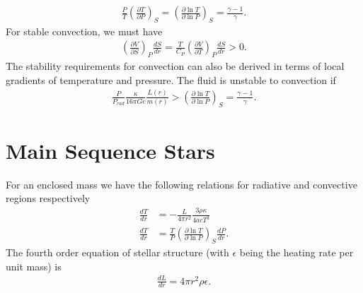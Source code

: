 \begin{multicols}{2}
\begin{align}
\frac{P}{T}\left(\frac{\partial T}{\partial P}\right)_S = \left(\frac{\partial \ln T}{\partial \ln P}\right)_S = \frac{\gamma -1}{\gamma}.
\end{align}
For stable convection, we must have
\begin{align}
\left(\frac{\partial V}{\partial S}\right)_P\frac{dS}{dr} = \frac{T}{C_P}\left(\frac{\partial V}{\partial T}\right)_P\frac{dS}{dr} > 0.
\end{align}
The stability requirements for convection can also be derived in terms of local gradients of temperature and pressure. The fluid is unstable to convection if
\begin{align}
\frac{P}{P_{rad}}\frac{\kappa}{16\pi Gc}\frac{L(r)}{m(r)} > \left(\frac{\partial \ln T}{\partial \ln P}\right)_S = \frac{\gamma-1}{\gamma}.
\end{align}
\section{Main Sequence Stars}
For an enclosed mass we have the following relations for radiative and convective regions respectively
\begin{align}
	\frac{dT}{dr} &= -\frac{L}{4\pi r^2}\frac{3\rho \kappa}{4acT^3} \\
	\frac{dT}{dr} &= \frac{T}{P}\left(\frac{\partial \ln T}{\partial \ln P}\right)_S \frac{dP}{dr}.
\end{align}
The fourth order equation of stellar structure  (with $\epsilon$ being the heating rate per unit mass) is
\begin{align}
	\frac{dL}{dr} = 4\pi r^2\rho \epsilon.
\end{align}
\end{multicols}
